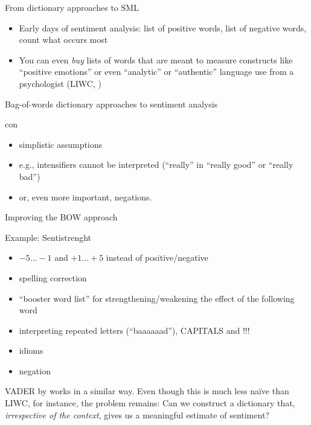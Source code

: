 \begin{frame}{From dictionary approaches to SML}
  \begin{itemize}[<+->]
  \item Early days of sentiment analysis: list of positive words, list of negative words, count what occurs most
  \item You can even \textit{buy} lists of words that are meant to measure constructs like ``positive emotions'' or even ``analytic'' or ``authentic'' language use from a psychologist (LIWC, \cite{Pennebaker2007})
  \end{itemize}
\end{frame}




\begin{frame}{Bag-of-words dictionary approaches to sentiment analysis}
  \begin{block}{con}
    \begin{itemize}
    \item simplistic assumptions
    \item e.g., intensifiers cannot be interpreted (``really'' in ``really good'' or ``really bad'')
    \item or, even more important, negations.
    \end{itemize}
  \end{block}
\end{frame}




\begin{frame}{Improving the BOW approach}
  \begin{block}{Example: Sentistrenght \parencite{Thelwall2012}}
    \begin{itemize}
    \item $-5\ldots-1$ and $+1\ldots+5$ instead of positive/negative
    \item spelling correction
    \item ``booster word list'' for strengthening/weakening the effect of the following word
    \item interpreting repeated letters (``baaaaaad''), CAPITALS and !!!
    \item idioms
    \item negation 
    \end{itemize}
	\end{block}
	VADER by \cite{Hutto2014} works in a similar way.
	\pause
	\footnotesize{Even though this is much less na\"ive than LIWC, for instance, the problem remains: Can we construct a dictionary that, \emph{irrespective of the context}, gives us a meaningful estimate of sentiment? }
\end{frame}





